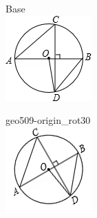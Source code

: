 \documentclass[12pt]{article}
\begin{document}
\begin{center}
\begin{minipage}{0.32\textwidth}\centering
Base\\
\includegraphics[width=0.95\linewidth]{out_rommath_origin/items/geo509-origin/assets/figure.png}
\end{minipage}
\hfill\begin{minipage}{0.32\textwidth}\centering
geo509-origin\_rot30\\
\includegraphics[width=0.95\linewidth]{out_rommath_origin/items/geo509-origin/assets/figure_rot30.png}

\end{minipage}
\end{center}
\end{document}

